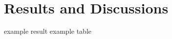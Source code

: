 \documentclass[sigconf, screen]{acmart}
\begin{document}
\section{Results and Discussions}
example result
\newline
example table
        
        
        
\end{document}
